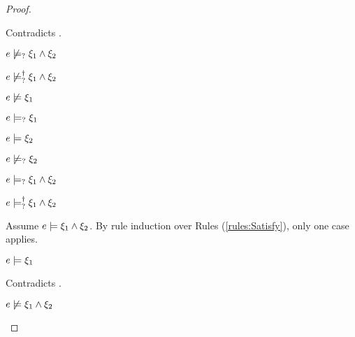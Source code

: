 \begin{proof}
\begin{byCases}
\begin{byCases}
\begin{byCases}
\begin{pfsteps*}
            \end{pfsteps*}
            Contradicts .
        \end{byCases}
        \begin{pfsteps*}
        \item $e \not\models_{?} \xi_1 \wedge \xi_2$  
        \item $e \not\models_{?}^{\dag} \xi_1 \wedge \xi_2$ 
        \end{pfsteps*}
    \item[\cmaysatisfy{e}{\xi_1},\csatisfy{e}{\xi_2}]
        \begin{pfsteps*}
        \item $e \not\models \xi_1$  
        \item $e \models_{?} \xi_1$  
        \item $e \models \xi_2$  
        \item $e \not\models_{?} \xi_2$  
        \item $e \models_{?} \xi_1 \wedge \xi_2$  
        \item $e \models_{?}^{\dag} \xi_1 \wedge \xi_2$ 
        \end{pfsteps*}
        Assume $e \models \xi_1 \wedge \xi_2$. By rule induction over Rules (\ref{rules:Satisfy}), only one case applies.
        \begin{byCases}
        \item[\text{(\ref{rule:CSAnd})}]
            \begin{pfsteps*}
            \item $e \models \xi_1$ 
            \end{pfsteps*}
            Contradicts .
        \end{byCases}
        \begin{pfsteps*}
        \item $e \not\models \xi_1 \wedge \xi_2$ 
        \end{pfsteps*}
        

\end{byCases}
\end{byCases}
\end{proof}

